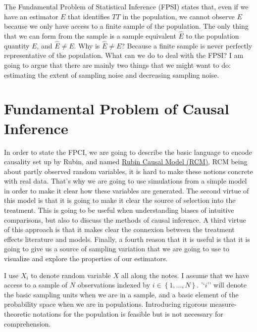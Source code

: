 \documentclass[]{book}
\theoremstyle{definition}
\theoremstyle{definition}
\theoremstyle{definition}
\theoremstyle{remark}
\begin{document}
The Fundamental Problem of Statistical Inference (FPSI) states that, even if we have an estimator \(E\) that identifies \(TT\) in the population, we cannot observe \(E\) because we only have access to a finite sample of the population.
The only thing that we can form from the sample is a sample equivalent \(\hat{E}\) to the population quantity \(E\), and \(\hat{E}\neq E\).
Why is \(\hat{E}\neq E\)?
Because a finite sample is never perfectly representative of the population.
What can we do to deal with the FPSI?
I am going to argue that there are mainly two things that we might want to do: estimating the extent of sampling noise and decreasing sampling noise.

\hypertarget{FPCI}{%
\chapter{Fundamental Problem of Causal Inference}\label{FPCI}}

In order to state the FPCI, we are going to describe the basic language to encode causality set up by Rubin, and named \href{RCM.html}{Rubin Causal Model (RCM)}.
RCM being about partly observed random variables, it is hard to make these notions concrete with real data.
That's why we are going to use simulations from a simple model in order to make it clear how these variables are generated.
The second virtue of this model is that it is going to make it clear the source of selection into the treatment.
This is going to be useful when understanding biases of intuitive comparisons, but also to discuss the methods of causal inference.
A third virtue of this approach is that it makes clear the connexion between the treatment effects literature and models.
Finally, a fourth reason that it is useful is that it is going to give us a source of sampling variation that we are going to use to visualize and explore the properties of our estimators.

I use \(X_i\) to denote random variable \(X\) all along the notes.
I assume that we have access to a sample of \(N\) observations indexed by \(i\in\left\{1,\dots,N\right\}\).
'`\(i\)'' will denote the basic sampling units when we are in a sample, and a basic element of the probability space when we are in populations.
Introducing rigorous measure-theoretic notations for the population is feasible but is not necessary for comprehension.
\end{document}
